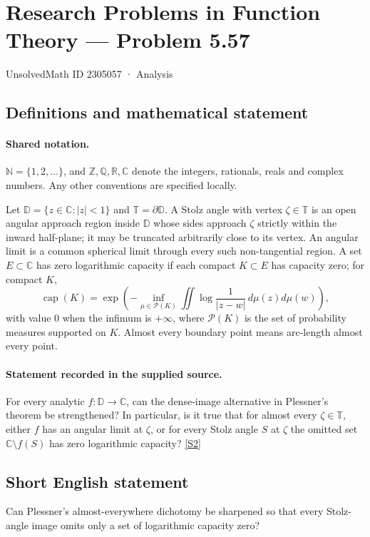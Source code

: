 \documentclass[11pt]{book}
\newcommand{\sref}[2]{\hyperlink{source:#1:#2}{[S#2]}}
\begin{document}
\setcounter{section}{2305056}
\section{Research Problems in Function Theory — Problem 5.57}\label{2305057}
{\small\sffamily UnsolvedMath ID 2305057 · Analysis}
\subsection{Definitions and mathematical statement}

\paragraph{Shared notation.}$\mathbb N=\{1,2,\ldots\}$, and $\mathbb Z,\mathbb Q,\mathbb R,\mathbb C$ denote the integers, rationals, reals and complex numbers. Any other conventions are specified locally.


Let $\mathbb D=\{z\in\mathbb C:|z|<1\}$ and $\mathbb T=\partial\mathbb D$. A Stolz angle with vertex $\zeta\in\mathbb T$ is an open angular approach region inside $\mathbb D$ whose sides approach $\zeta$ strictly within the inward half-plane; it may be truncated arbitrarily close to its vertex. An angular limit is a common spherical limit through every such non-tangential region. A set $E\subset\mathbb C$ has zero logarithmic capacity if each compact $K\subset E$ has capacity zero; for compact $K$, \[\operatorname{cap}(K)=\exp\left(-\inf_{\mu\in\mathcal P(K)}\iint\log\frac1{|z-w|}\,d\mu(z)d\mu(w)\right),\] with value $0$ when the infimum is $+\infty$, where $\mathcal P(K)$ is the set of probability measures supported on $K$. Almost every boundary point means arc-length almost every point.
\paragraph{Statement recorded in the supplied source.}
For every analytic $f:\mathbb D\to\mathbb C$, can the dense-image alternative in Plessner’s theorem be strengthened? In particular, is it true that for almost every $\zeta\in\mathbb T$, either $f$ has an angular limit at $\zeta$, or for every Stolz angle $S$ at $\zeta$ the omitted set $\mathbb C\setminus f(S)$ has zero logarithmic capacity? \sref{2305057}{2}
\subsection{Short English statement}
Can Plessner’s almost-everywhere dichotomy be sharpened so that every Stolz-angle image omits only a set of logarithmic capacity zero?
\end{document}
